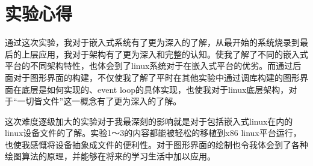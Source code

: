 \documentclass{report}
\begin{document}
\chapter*{实验心得}
\par 通过这次实验，我对于嵌入式系统有了更为深入的了解，从最开始的系统烧录到最后的上层应用，我对于架构有了更为深入和完整的认知。使我了解了不同的嵌入式平台的不同架构特性，也体会到了linux系统对于在嵌入式平台的优劣。而通过后面对于图形界面的构建，不仅使我了解了平时在其他实验中通过调库构建的图形界面在底层是如何实现的、event loop的具体实现，也使我对于linux底层架构，对于“一切皆文件”这一概念有了更为深入的了解。
\par 这次难度逐级加大的实验对于我最深刻的影响就是对于包括嵌入式linux在内的linux设备文件的了解。实验1～3的内容都能被轻松的移植到x86 linux平台运行，也使我感慨将设备抽象成文件的便利性。对于图形界面的绘制也令我体会到了各种绘图算法的原理，并能够在将来的学习生活中加以应用。


%
\end{document}

